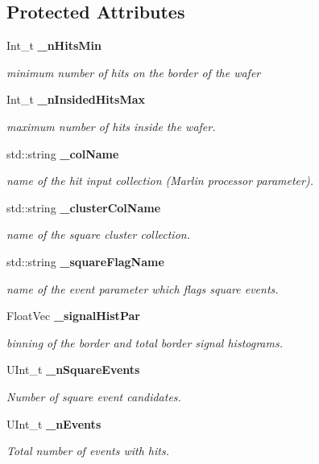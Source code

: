 \subsection*{Protected Attributes}
\begin{DoxyCompactItemize}
\item 
Int\_\-t {\bf \_\-nHitsMin}\label{classCALICE_1_1SquareFinder_a2c9c17a9f50875e1762b5c2347209d3c}

\begin{DoxyCompactList}\small\item\em minimum number of hits on the border of the wafer \item\end{DoxyCompactList}\item 
Int\_\-t {\bf \_\-nInsidedHitsMax}
\begin{DoxyCompactList}\small\item\em maximum number of hits inside the wafer. \item\end{DoxyCompactList}\item 
std::string {\bf \_\-colName}
\begin{DoxyCompactList}\small\item\em name of the hit input collection (Marlin processor parameter). \item\end{DoxyCompactList}\item 
std::string {\bf \_\-clusterColName}
\begin{DoxyCompactList}\small\item\em name of the square cluster collection. \item\end{DoxyCompactList}\item 
std::string {\bf \_\-squareFlagName}
\begin{DoxyCompactList}\small\item\em name of the event parameter which flags square events. \item\end{DoxyCompactList}\item 
FloatVec {\bf \_\-signalHistPar}
\begin{DoxyCompactList}\small\item\em binning of the border and total border signal histograms. \item\end{DoxyCompactList}\item 
UInt\_\-t {\bf \_\-nSquareEvents}
\begin{DoxyCompactList}\small\item\em Number of square event candidates. \item\end{DoxyCompactList}\item 
UInt\_\-t {\bf \_\-nEvents}
\begin{DoxyCompactList}\small\item\em Total number of events with hits. \item\end{DoxyCompactList}\end{DoxyCompactItemize}


